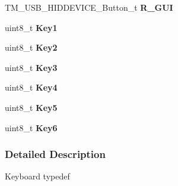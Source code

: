\begin{DoxyCompactItemize}
\item 
\hypertarget{struct_t_m___u_s_b___h_i_d_d_e_v_i_c_e___keyboard__t_a7c68006b677f5bee4f334a59759d4384}{}T\+M\+\_\+\+U\+S\+B\+\_\+\+H\+I\+D\+D\+E\+V\+I\+C\+E\+\_\+\+Button\+\_\+t {\bfseries R\+\_\+\+G\+U\+I}\label{struct_t_m___u_s_b___h_i_d_d_e_v_i_c_e___keyboard__t_a7c68006b677f5bee4f334a59759d4384}

\item 
\hypertarget{struct_t_m___u_s_b___h_i_d_d_e_v_i_c_e___keyboard__t_a2843a0b3564f9c664491d703ad511ca3}{}uint8\+\_\+t {\bfseries Key1}\label{struct_t_m___u_s_b___h_i_d_d_e_v_i_c_e___keyboard__t_a2843a0b3564f9c664491d703ad511ca3}

\item 
\hypertarget{struct_t_m___u_s_b___h_i_d_d_e_v_i_c_e___keyboard__t_ac7484338a7c3217c21189a3048c98b74}{}uint8\+\_\+t {\bfseries Key2}\label{struct_t_m___u_s_b___h_i_d_d_e_v_i_c_e___keyboard__t_ac7484338a7c3217c21189a3048c98b74}

\item 
\hypertarget{struct_t_m___u_s_b___h_i_d_d_e_v_i_c_e___keyboard__t_a96b310a169539388773b5ec326b062ea}{}uint8\+\_\+t {\bfseries Key3}\label{struct_t_m___u_s_b___h_i_d_d_e_v_i_c_e___keyboard__t_a96b310a169539388773b5ec326b062ea}

\item 
\hypertarget{struct_t_m___u_s_b___h_i_d_d_e_v_i_c_e___keyboard__t_a5ad334324652aaad5644f540ee8323cd}{}uint8\+\_\+t {\bfseries Key4}\label{struct_t_m___u_s_b___h_i_d_d_e_v_i_c_e___keyboard__t_a5ad334324652aaad5644f540ee8323cd}

\item 
\hypertarget{struct_t_m___u_s_b___h_i_d_d_e_v_i_c_e___keyboard__t_a85fc37ae9638cc0a682d8d137e1cf17b}{}uint8\+\_\+t {\bfseries Key5}\label{struct_t_m___u_s_b___h_i_d_d_e_v_i_c_e___keyboard__t_a85fc37ae9638cc0a682d8d137e1cf17b}

\item 
\hypertarget{struct_t_m___u_s_b___h_i_d_d_e_v_i_c_e___keyboard__t_ae246f318868f98374998247b1bf1732a}{}uint8\+\_\+t {\bfseries Key6}\label{struct_t_m___u_s_b___h_i_d_d_e_v_i_c_e___keyboard__t_ae246f318868f98374998247b1bf1732a}

\end{DoxyCompactItemize}


\subsubsection{Detailed Description}
Keyboard typedef

